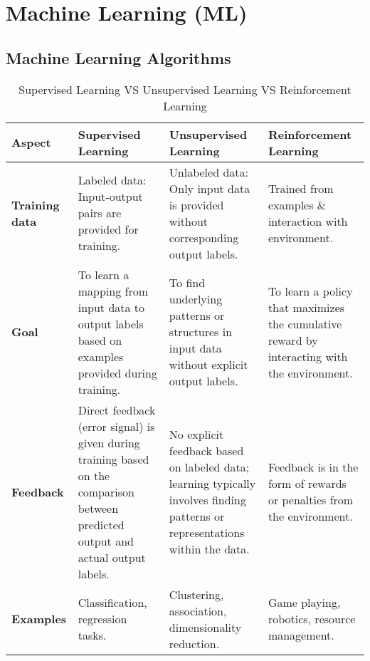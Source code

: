 \chapter{Machine Learning (ML)}

\section{Machine Learning Algorithms}\label{Machine Learning Algorithms}

\begin{longtable}{|p{1.6cm}|p{4.5cm}|p{4.5cm}|p{4.5cm}|}
    \caption{Supervised Learning VS Unsupervised Learning VS Reinforcement Learning \cite{chatgpt,medium-numsmt2-rl-ch1-part-1}} \\
    \hline
    \textbf{Aspect} & \textbf{Supervised Learning} & \textbf{Unsupervised Learning} & \textbf{Reinforcement Learning} \\
    \hline
    \endfirsthead
    \endhead
    \hline
    \endfoot
    \hline
    \endlastfoot
    
    \textbf{Training data} & Labeled data: Input-output pairs are provided for training. & Unlabeled data: Only input data is provided without corresponding output labels. & Trained from examples \& interaction with environment. \\
    \hline
    \textbf{Goal} & To learn a mapping from input data to output labels based on examples provided during training. & To find underlying patterns or structures in input data without explicit output labels. & To learn a policy that maximizes the cumulative reward by interacting with the environment. \\
    \hline
    \textbf{Feedback} & Direct feedback (error signal) is given during training based on the comparison between predicted output and actual output labels. & No explicit feedback based on labeled data; learning typically involves finding patterns or representations within the data. & Feedback is in the form of rewards or penalties from the environment. \\
    \hline
    \textbf{Examples} & Classification, regression tasks. & Clustering, association, dimensionality reduction. & Game playing, robotics, resource management. \\
    \hline
\end{longtable}










